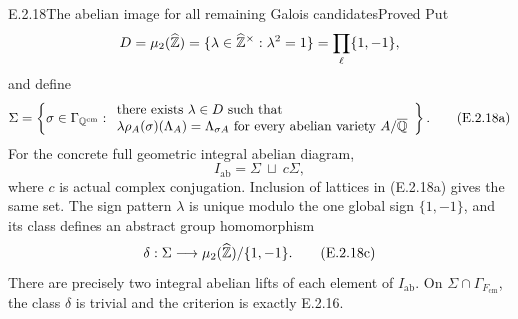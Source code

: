 \begin{result}{E.2.18}{The abelian image for all remaining Galois candidates}{Proved}
Put
\[
 D=\mu_2(\widehat{\mathbb Z})
   =\{\lambda\in\widehat{\mathbb Z}^\times:\lambda^2=1\}
   =\prod_\ell\{1,-1\},
\]
and define
\[
 \Sigma=\left\{\sigma\in\Gamma_{\mathbb Q^{\mathrm{cm}}}:
 \begin{array}{l}
  \text{there exists }\lambda\in D\text{ such that}\\
  \lambda\rho_A(\sigma)(\Lambda_A)=\Lambda_{\sigma A}
       \text{ for every abelian variety }A/\overline{\mathbb Q}
 \end{array}\right\}.
 \tag{E.2.18a}
\]
For the concrete full geometric integral abelian diagram,
\[
 I_{\mathrm{ab}}=\Sigma\ \sqcup\ c\Sigma,
 \tag{E.2.18b}
\]
where \(c\) is actual complex conjugation. Inclusion of lattices
in (E.2.18a) gives the same set. The sign pattern \(\lambda\)
is unique modulo the one global sign \(\{1,-1\}\), and its class
defines an abstract group homomorphism
\[
 \delta:\Sigma\longrightarrow
       \mu_2(\widehat{\mathbb Z})/\{1,-1\}.
 \tag{E.2.18c}
\]
There are precisely two integral abelian lifts of each element
of \(I_{\mathrm{ab}}\). On
\(\Sigma\cap\Gamma_{F_{\mathrm{cm}}}\), the class \(\delta\)
is trivial and the criterion is exactly E.2.16.
\end{result}
